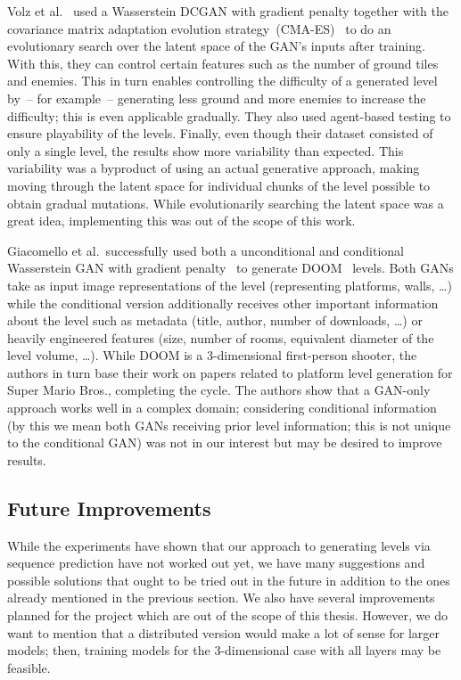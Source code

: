 Volz et
al.~\cite{volzEvolvingMarioLevels2018,thehedgeifyTheHedgeifyDagstuhlGAN2019}
used a Wasserstein DCGAN with gradient penalty together with the
covariance matrix adaptation evolution
strategy~(CMA-ES)~\cite{hansenCompletelyDerandomizedSelfAdaptation2006}
to do an evolutionary search over the latent space of the GAN's inputs
after training. With this, they can control certain features such as
the number of ground tiles and enemies. This in turn enables
controlling the difficulty of a generated level by~-- for example~--
generating less ground and more enemies to increase the difficulty;
this is even applicable gradually. They also used agent-based testing
to ensure playability of the levels. Finally, even though their
dataset consisted of only a single level, the results show more
variability than expected. This variability was a byproduct of using
an actual generative approach, making moving through the latent space
for individual chunks of the level possible to obtain gradual
mutations. While evolutionarily searching the latent space was a great
idea, implementing this was out of the scope of this work.

Giacomello et al.\ successfully used both a unconditional and
conditional Wasserstein GAN with gradient
penalty~\cite{gulrajaniImprovedTrainingWasserstein2017} to generate
DOOM~\cite{Doom1993Video2019} levels. Both GANs take as input image
representations of the level (representing platforms, walls, \dots)
while the conditional version additionally receives other important
information about the level such as metadata (title, author, number of
downloads, \dots) or heavily engineered features (size, number of
rooms, equivalent diameter of the level volume, \dots). While DOOM is
a 3-dimensional first-person shooter, the authors in turn base their
work on papers related to platform level generation for Super Mario
Bros., completing the cycle. The authors show that a GAN-only approach
works well in a complex domain; considering conditional information
(by this we mean both GANs receiving prior level information; this is
not unique to the conditional GAN) was not in our interest but may be
desired to improve results.

\subsection{Future Improvements}

While the experiments have shown that our approach to generating
levels via sequence prediction have not worked out yet, we have many
suggestions and possible solutions that ought to be tried out in the
future in addition to the ones already mentioned in the previous
section. We also have several improvements planned for the project
which are out of the scope of this thesis. However, we do want to
mention that a distributed version would make a lot of sense for
larger models; then, training models for the 3-dimensional case with
all layers may be feasible.

